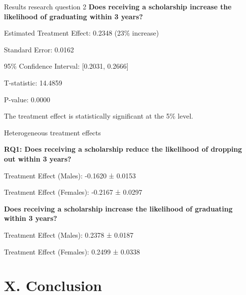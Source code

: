 \documentclass[aspectratio=169]{beamer}
\begin{document}
\begin{frame}{Results research question 2}
\textbf{Does receiving a scholarship increase the likelihood of graduating within 3 years?}

Estimated Treatment Effect: 0.2348 (23\% increase)

Standard Error: 0.0162

95\% Confidence Interval: [0.2031, 0.2666]

T-statistic: 14.4859

P-value: 0.0000

The treatment effect is statistically significant at the 5\% level.

\end{frame}

\begin{frame}{Heterogeneous treatment effects}

\textbf{RQ1: Does receiving a scholarship reduce the likelihood of dropping out within 3 years?}

Treatment Effect (Males): -0.1620 ± 0.0153

Treatment Effect (Females): -0.2167 ± 0.0297

\textbf{Does receiving a scholarship increase the likelihood of graduating within 3 years?}

Treatment Effect (Males): 0.2378 ± 0.0187

Treatment Effect (Females): 0.2499 ± 0.0338


\end{frame}


\section{X. Conclusion}

  
\end{document}
